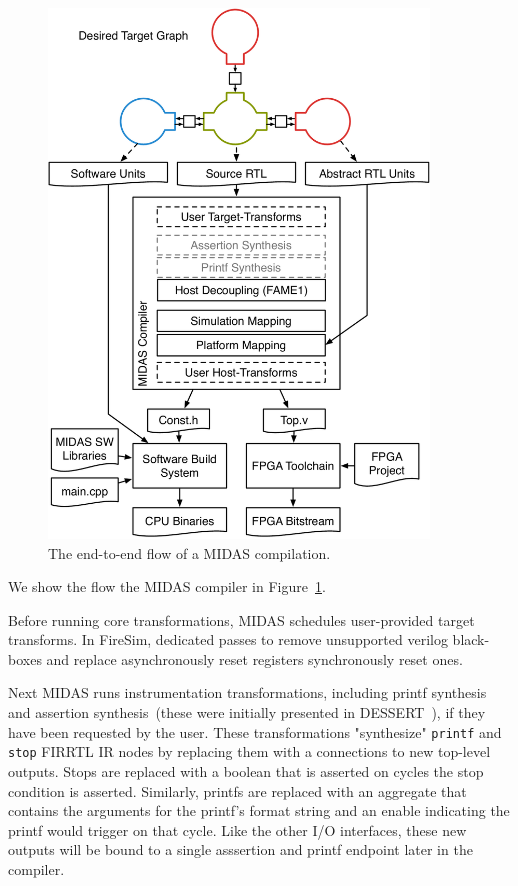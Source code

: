 \begin{figure}
    \centering
    \includegraphics[width=0.9\textwidth]{figures/midas-flow.pdf}
    \caption{The end-to-end flow of a MIDAS compilation.}
    \label{fig:midas-flow}
\end{figure}

    We show the flow the MIDAS compiler in Figure~\ref{fig:midas-flow}.

    Before running core transformations, MIDAS schedules user-provided target transforms.
    In FireSim, dedicated passes to remove unsupported verilog black-boxes and
    replace asynchronously reset registers synchronously reset ones.

    Next MIDAS runs instrumentation transformations, including printf synthesis
    and assertion synthesis~(these were initially presented in DESSERT~\cite{DESSERT}), if they have been requested by the user. These
    transformations "synthesize" \texttt{printf} and \texttt{stop} FIRRTL IR
    nodes by replacing them with a connections to new top-level outputs. Stops are
    replaced with a boolean that is asserted on cycles the stop condition is asserted. Similarly, printfs are replaced with an aggregate that contains
    the arguments for the printf's format string and an enable indicating the
    printf would trigger on that cycle. Like the other I/O interfaces, these new outputs will be bound to a single asssertion
    and printf endpoint later in the compiler.


